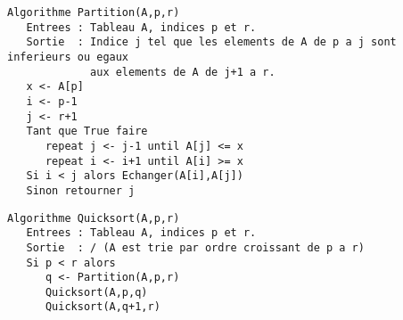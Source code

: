 \documentclass{article}
\begin{document}
\begin{lstlisting}
Algorithme Partition(A,p,r)
   Entrees : Tableau A, indices p et r.
   Sortie  : Indice j tel que les elements de A de p a j sont inferieurs ou egaux
             aux elements de A de j+1 a r.
   x <- A[p]
   i <- p-1
   j <- r+1
   Tant que True faire
      repeat j <- j-1 until A[j] <= x
      repeat i <- i+1 until A[i] >= x
   Si i < j alors Echanger(A[i],A[j])
   Sinon retourner j
\end{lstlisting}

\begin{lstlisting}
Algorithme Quicksort(A,p,r)
   Entrees : Tableau A, indices p et r.
   Sortie  : / (A est trie par ordre croissant de p a r)
   Si p < r alors
      q <- Partition(A,p,r)
      Quicksort(A,p,q)
      Quicksort(A,q+1,r)
\end{lstlisting}
\end{document}
